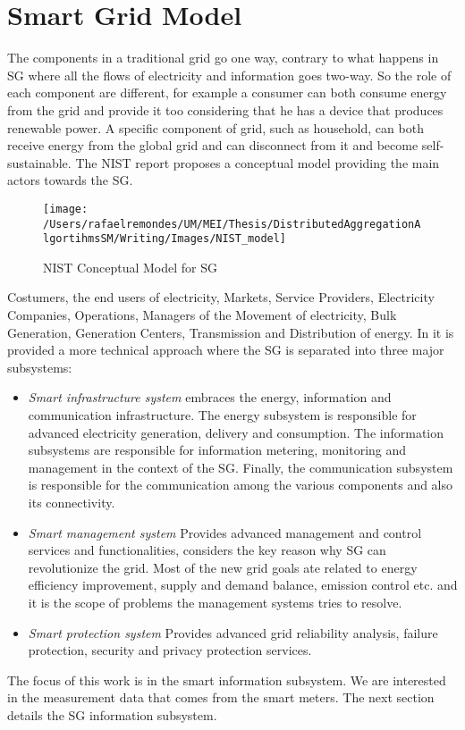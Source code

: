 \section{Smart Grid Model}
 The components in a traditional grid go one way, contrary to what happens in SG where all the flows of electricity and information goes two-way.  So the role of each component are different, for example a consumer can both consume energy from the grid and provide it too considering that he has a device that produces renewable power. A specific component of grid, such as household, can both receive energy from the global grid and can disconnect from it and become self-sustainable. The NIST report \cite{government2011nist} proposes a conceptual model providing the main actors towards the SG.
\begin{figure}[h]
\centering
\texttt{[image: /Users/rafaelremondes/UM/MEI/Thesis/DistributedAggregationAlgortihmsSM/Writing/Images/NIST\_model]}
\caption{\label{fig:NIST_model} NIST Conceptual Model for SG}
\end{figure}
Costumers, the end users of electricity, Markets, Service Providers, Electricity Companies, Operations, Managers of the Movement of electricity, Bulk Generation, Generation Centers, Transmission and Distribution of energy. 
In \cite{journals/comsur/FangMXY12} it is provided a more technical approach where the SG is separated into three major subsystems:
\begin{itemize}
\item \textit{Smart infrastructure system} embraces the energy, information and communication infrastructure. The energy subsystem is responsible for advanced electricity generation, delivery and consumption. The information subsystems are responsible for information metering, monitoring and management in the context of the SG. Finally, the communication subsystem is responsible for the communication among the various components and also its connectivity.   
\item \textit{Smart management system} Provides advanced management and control services and functionalities, \cite{journals/comsur/FangMXY12} considers the key reason why SG can revolutionize the grid.  Most of the new grid goals ate related to energy efficiency improvement, supply and demand balance, emission control etc. and it is the scope of problems the management systems tries to resolve.
\item \textit{Smart protection system} Provides advanced grid reliability analysis, failure protection, security and privacy protection services.
 \end{itemize}
The focus of this work is in the smart information subsystem. We are interested in the measurement data that comes from the smart meters. The next section details the SG information subsystem.
